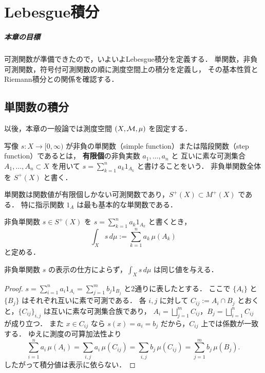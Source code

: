 \setcounter{chapter}{7}
\chapter{Lebesgue積分}

\paragraph{本章の目標}
可測関数が準備できたので，いよいよLebesgue積分を定義する．
単関数，非負可測関数，符号付可測関数の順に測度空間上の積分を定義し，
その基本性質とRiemann積分との関係を確認する．

\section{単関数の積分}

以後，本章の一般論では測度空間 $(X,\mathcal M,\mu)$ を固定する．

\begin{definition}[非負単関数]\label{def:nonnegative-simple-function}
写像 $s:X \to [0,\infty)$ が非負の単関数（simple function）または階段関数（step function）であるとは，
\textbf{有限個}の非負実数 $a_1,\dots,a_n$ と
互いに素な可測集合 $A_1,\dots,A_n \subset X$ を用いて
$s=\sum_{k=1}^n a_k 1_{A_k}$ と書けることをいう．
非負単関数全体を $S^+(X)$ と書く．
\end{definition}

\begin{remark}
単関数は関数値が有限個しかない可測関数であり，$S^+(X)\subset M^+(X)$ である．
特に指示関数 $1_A$ は最も基本的な単関数である．
\end{remark}

\begin{definition}[単関数の積分]\label{def:simple-function-integral}
非負単関数 $s\in S^+(X)$ を $s=\sum_{k=1}^n a_k 1_{A_k}$ と書くとき，
\[
\int_X s\,d\mu
:=
\sum_{k=1}^n a_k\,\mu(A_k)
\]
と定める．
\end{definition}

\begin{proposition}\label{prop:simple-function-integral-well-defined}
非負単関数 $s$ の表示の仕方によらず，$\int_X s\,d\mu$ は同じ値を与える．
\end{proposition}
\begin{proof}
$s=\sum_{i=1}^n a_i 1_{A_i}=\sum_{j=1}^m b_j 1_{B_j}$ と2通りに表したとする．
ここで $\{A_i\}$ と $\{B_j\}$ はそれぞれ互いに素で可測である．
各 $i,j$ に対して $C_{ij}:=A_i \cap B_j$ とおくと，$\{C_{ij}\}_{i,j}$ は互いに素な可測集合族であり，
$A_i=\bigsqcup_{j=1}^m C_{ij}$，$B_j=\bigsqcup_{i=1}^n C_{ij}$ が成り立つ．
また $x \in C_{ij}$ なら $s(x)=a_i=b_j$ だから，$C_{ij}$ 上では係数が一致する．
ゆえに測度の可算加法性より
\[
\sum_{i=1}^n a_i\,\mu(A_i)
=\sum_{i,j}a_i\,\mu(C_{ij})
=\sum_{i,j}b_j\,\mu(C_{ij})
=\sum_{j=1}^m b_j\,\mu(B_j).
\]
したがって積分値は表示に依らない．
\end{proof}

